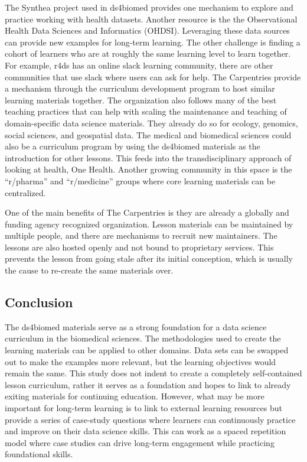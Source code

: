 \documentclass[030-workshop.tex]{subfiles}
\begin{document}
        The Synthea project used in ds4biomed provides one mechanism to explore and practice working with health datasets.
        Another resource is the the Observational Health Data Sciences and Informatics (OHDSI).
        Leveraging these data sources can provide new examples for long-term learning.
        The other challenge is finding a cohort of learners who are at roughly the same learning level to learn together.
        For example, r4ds has an online slack learning community,
        there are other communities that use slack where users can ask for help.
        The Carpentries provide a mechanism through the curriculum development program to host similar learning materials together.
        The organization also follows many of the best teaching practices that can help with scaling the maintenance and
        teaching of domain-specific data science materials.
        They already do so for ecology, genomics, social sciences, and geospatial data.
        The medical and biomedical sciences could also be a curriculum program by using the ds4biomed materials as the introduction
        for other lessons.
        This feeds into the transdisciplinary approach of looking at health, One Health.
        Another growing community in this space is the ``r/pharma'' and ``r/medicine'' groups where core learning materials
        can be centralized.

        One of the main benefits of The Carpentries is they are already a globally and funding agency recognized organization.
        Lesson materials can be maintained by multiple people, and there are mechanisms to recruit new maintainers.
        The lessons are also hosted openly and not bound to proprietary services.
        This prevents the lesson from going stale after its initial conception,
        which is usually the cause to re-create the same materials over.

    \subsection{Conclusion}

        The ds4biomed materials serve as a strong foundation for a data science curriculum in the biomedical sciences.
        The methodologies used to create the learning materials can be applied to other domains.
        Data sets can be swapped out to make the examples more relevant,
        but the learning objectives would remain the same.
        This study does not indent to create a completely self-contained lesson curriculum,
        rather it serves as a foundation and hopes to link to already exiting materials for continuing education.
        However, what may be more important for long-term learning
        is to link to external learning resources but provide a series of case-study questions
        where learners can continuously practice and improve on their data science skills.
        This can work as a spaced repetition model where case studies can drive long-term engagement while practicing
        foundational skills.
\end{document}

